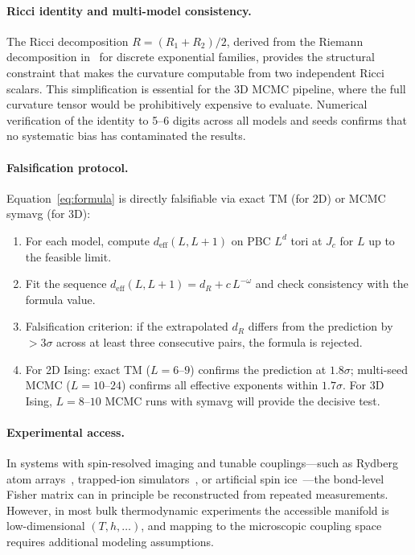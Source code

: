\documentclass[aps,prl,twocolumn,superscriptaddress,showpacs]{revtex4-2}
\newcommand{\Scal}{R}
\newcommand{\Jc}{J_c}
\newcommand{\dR}{d_{\Scal}}
\begin{document}
\paragraph{Ricci identity and multi-model consistency.}
The Ricci decomposition $R = (R_1 + R_2)/2$, derived from the Riemann
decomposition in~\cite{Paper7} for discrete exponential families, provides the structural constraint
that makes the curvature computable from two independent Ricci scalars.
This simplification is essential for the 3D MCMC pipeline, where the
full curvature tensor would be prohibitively expensive to evaluate.
Numerical verification of the identity to 5--6 digits across all
models and seeds confirms that no systematic bias has contaminated
the results.

\paragraph{Falsification protocol.}
Equation~\eqref{eq:formula} is directly falsifiable via exact TM
(for 2D) or MCMC symavg (for 3D):
\begin{enumerate}
  \item For each model, compute $d_\mathrm{eff}(L, L+1)$ on PBC $L^d$ tori
    at $\Jc$ for $L$ up to the feasible limit.
  \item Fit the sequence $d_\mathrm{eff}(L, L+1) = \dR + c\, L^{-\omega}$ and
    check consistency with the formula value.
  \item Falsification criterion: if the extrapolated $\dR$ differs from the
    prediction by $>3\sigma$ across at least three consecutive pairs, the
    formula is rejected.
  \item For 2D Ising: exact TM ($L = 6$--$9$) confirms the prediction
    at $1.8\sigma$; multi-seed MCMC ($L = 10$--$24$) confirms all
    effective exponents within $1.7\sigma$. For 3D Ising,
    $L = 8$--$10$ MCMC runs with symavg will provide the decisive test.
\end{enumerate}

\paragraph{Experimental access.}
In systems with spin-resolved imaging and tunable couplings---such
as Rydberg atom arrays~\cite{Browaeys2020}, trapped-ion
simulators~\cite{Monroe2021}, or artificial spin
ice~\cite{Skjaervo2020}---the bond-level Fisher matrix can in
principle be reconstructed from repeated measurements. However, in
most bulk thermodynamic experiments the accessible manifold is
low-dimensional $(T, h, \ldots)$, and mapping to the microscopic
coupling space requires additional modeling assumptions.
\end{document}
